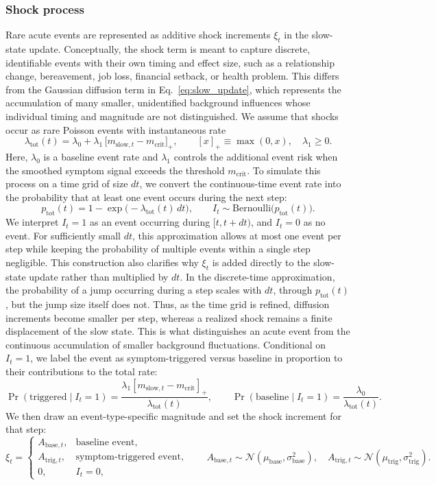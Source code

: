 \documentclass[man,12pt,floatsintext]{apa7}
\begin{document}
\subsubsection{Shock process}
Rare acute events are represented as additive shock increments \(\xi_t\) in the slow-state update.
Conceptually, the shock term is meant to capture discrete, identifiable events with their own
timing and effect size, such as a relationship change, bereavement, job loss, financial setback,
or health problem. This differs from the Gaussian diffusion term in Eq.~\eqref{eq:slow_update},
which represents the accumulation of many smaller, unidentified background influences whose
individual timing and magnitude are not distinguished.
We assume that shocks occur as rare Poisson events with instantaneous rate
\begin{equation}
\lambda_{\text{tot}}(t)
=
\lambda_0
+
\lambda_1\,\big[m_{\text{slow},t}-m_{\text{crit}}\big]_+,
\qquad [x]_+\equiv \max(0,x),\quad \lambda_1\ge 0.
\label{eq:lambda_tot_app}
\end{equation}
Here, \(\lambda_0\) is a baseline event rate and \(\lambda_1\) controls the additional event risk when the smoothed symptom signal exceeds the threshold \(m_{\text{crit}}\).
To simulate this process on a time grid of size \(dt\), we convert the continuous-time event rate into the probability that at least one event occurs during the next step:
\[
p_{\text{tot}}(t)=1-\exp\!\big(-\lambda_{\text{tot}}(t)\,dt\big),
\qquad
I_t\sim\mathrm{Bernoulli}\!\big(p_{\text{tot}}(t)\big).
\]
We interpret \(I_t=1\) as an event occurring during \([t,t+dt)\), and \(I_t=0\) as no event. For sufficiently small \(dt\), this approximation allows at most one event per step while keeping the probability of multiple events within a single step negligible.
This construction also clarifies why \(\xi_t\) is added directly to the slow-state update rather
than multiplied by \(dt\). In the discrete-time approximation, the probability of a jump occurring
during a step scales with \(dt\), through \(p_{\text{tot}}(t)\), but the jump size itself does not.
Thus, as the time grid is refined, diffusion increments become smaller per step, whereas a realized
shock remains a finite displacement of the slow state. This is what distinguishes an acute event
from the continuous accumulation of smaller background fluctuations.
Conditional on \(I_t=1\), we label the event as symptom-triggered versus baseline in proportion to their contributions to the total rate:
\[
\Pr(\text{triggered}\mid I_t=1)=
\frac{\lambda_1[m_{\text{slow},t}-m_{\text{crit}}]_+}{\lambda_{\text{tot}}(t)},
\qquad
\Pr(\text{baseline}\mid I_t=1)=\frac{\lambda_0}{\lambda_{\text{tot}}(t)}.
\]
We then draw an event-type-specific magnitude and set the shock increment for that step:
\[
\xi_t=
\begin{cases}
A_{\text{base},t}, & \text{baseline event},\\
A_{\text{trig},t}, & \text{symptom-triggered event},\\
0, & I_t=0,
\end{cases}
\qquad
A_{\text{base},t}\sim \mathcal{N}(\mu_{\text{base}},\sigma^2_{\text{base}}),\quad
A_{\text{trig},t}\sim \mathcal{N}(\mu_{\text{trig}},\sigma^2_{\text{trig}}).
\]
\end{document}
